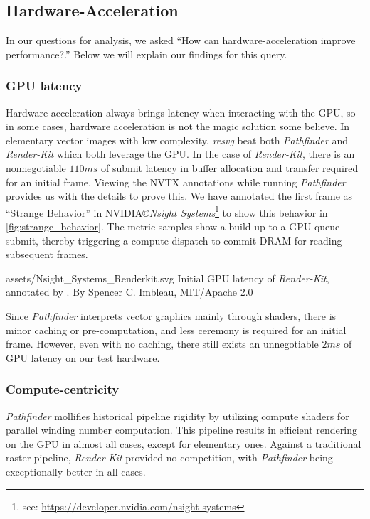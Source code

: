 \subsection{Hardware-Acceleration}
In our questions for analysis, we asked ``How can hardware-acceleration improve performance?.'' Below we will explain our findings for this query.\medskip

\subsubsection{GPU latency} Hardware acceleration always brings latency when interacting with the GPU, so in some cases, hardware acceleration is not the magic solution some believe. In elementary vector images with low complexity, \textit{resvg} beat both \textit{Pathfinder} and \textit{Render-Kit} which both leverage the GPU. In the case of \textit{Render-Kit}, there is an nonnegotiable \(110ms\) of submit latency in buffer allocation and transfer required for an initial frame. Viewing the NVTX annotations while running \textit{Pathfinder} provides us with the details to prove this. We have annotated the first frame as ``Strange Behavior'' in NVIDIA\copyright \textit{Nsight Systems}\footnote{see: \href{https://developer.nvidia.com/nsight-systems}{https://developer.nvidia.com/nsight-systems}} to show this behavior in \cref{fig:strange_behavior}. The metric samples show a build-up to a GPU queue submit, thereby triggering a compute dispatch to commit DRAM for reading subsequent frames.\medskip

\widesvg
{assets/Nsight_Systems_Renderkit.svg}
{Initial GPU latency of \textit{Render-Kit}, annotated by \toolname.\label{fig:strange_behavior}}
{By Spencer C. Imbleau, MIT/Apache 2.0}
\medskip

Since \textit{Pathfinder} interprets vector graphics mainly through shaders, there is minor caching or pre-computation, and less ceremony is required for an initial frame. However, even with no caching, there still exists an unnegotiable \(2ms\) of GPU latency on our test hardware.

\subsubsection{Compute-centricity} \textit{Pathfinder} mollifies historical pipeline rigidity by utilizing compute shaders for parallel winding number computation. This pipeline results in efficient rendering on the GPU in almost all cases, except for elementary ones. Against a traditional raster pipeline, \textit{Render-Kit} provided no competition, with \textit{Pathfinder} being exceptionally better in all cases.\medskip

